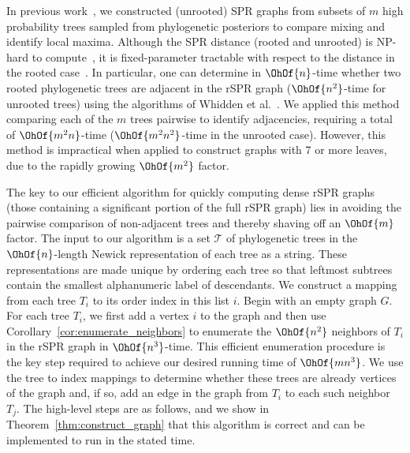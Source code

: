 \documentclass[10pt,twoside,leqno,twocolumn]{article}
\begin{document}
In previous work~\cite{Whidden2015-yi}, we constructed (unrooted) SPR graphs from subsets of $m$ high probability trees sampled from phylogenetic posteriors to compare mixing and identify local maxima.
Although the SPR distance (rooted and unrooted) is NP-hard to compute~\cite{bordewich05,hickey2008sdc}, it is fixed-parameter tractable with respect to the distance in the rooted case~\cite{bordewich05}.
In particular, one can determine in $\OhOf{n}$-time whether two rooted phylogenetic trees are adjacent in the rSPR graph ($\OhOf{n^2}$-time for unrooted trees) using the algorithms of Whidden et al.~\cite{whidden2009unifying,whidden2010fast, whidden2013hybridization,Whidden2015-yi}.
We applied this method comparing each of the $m$ trees pairwise to identify adjacencies, requiring a total of $\OhOf{m^2n}$-time ($\OhOf{m^2 n^2}$-time in the unrooted case).
However, this method is impractical when applied to construct graphs with 7 or more leaves, due to the rapidly growing $\OhOf{m^2}$ factor.

The key to our efficient algorithm for quickly computing dense rSPR graphs (those containing a significant portion of the full rSPR graph) lies in avoiding the pairwise comparison of non-adjacent trees and thereby shaving off an $\OhOf{m}$ factor.
The input to our algorithm is a set $\mathcal{T}$ of phylogenetic trees in the $\OhOf{n}$-length Newick \cite{wiki:newick} representation of each tree as a string.
These representations are made unique by ordering each tree so that leftmost subtrees contain the smallest alphanumeric label of descendants.
We construct a mapping from each tree $T_i$ to its order index in this list $i$.
Begin with an empty graph $G$.
For each tree $T_i$, we first add a vertex $i$ to the graph and then use Corollary~\ref{cor:enumerate_neighbors} to enumerate the $\OhOf{n^2}$ neighbors of $T_i$ in the rSPR graph in $\OhOf{n^3}$-time.
This efficient enumeration procedure is the key step required to achieve our desired running time of $\OhOf{mn^3}$.
We use the tree to index mappings to determine whether these trees are already vertices of the graph and, if so, add an edge in the graph from $T_i$ to each such neighbor $T_j$.
The high-level steps are as follows, and we show in Theorem~\ref{thm:construct_graph} that this algorithm is correct and can be implemented to run in the stated time.
\end{document}
